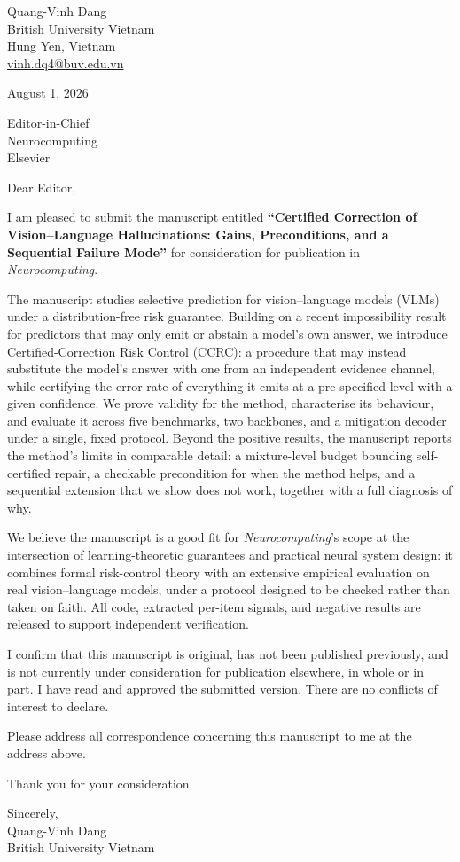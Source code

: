 \documentclass[11pt]{article}
\begin{document}
\begin{flushleft}
Quang-Vinh Dang \\
British University Vietnam \\
Hung Yen, Vietnam \\
\href{mailto:vinh.dq4@buv.edu.vn}{vinh.dq4@buv.edu.vn}
\end{flushleft}

\begin{flushright}
August 1, 2026
\end{flushright}

\noindent Editor-in-Chief \\
Neurocomputing \\
Elsevier

\bigskip
\noindent Dear Editor,

\medskip
\noindent I am pleased to submit the manuscript entitled \textbf{``Certified Correction of
Vision--Language Hallucinations: Gains, Preconditions, and a Sequential Failure Mode''} for
consideration for publication in \emph{Neurocomputing}.

\medskip
\noindent The manuscript studies selective prediction for vision--language models (VLMs) under
a distribution-free risk guarantee. Building on a recent impossibility result for predictors
that may only emit or abstain a model's own answer, we introduce Certified-Correction Risk
Control (CCRC): a procedure that may instead substitute the model's answer with one from an
independent evidence channel, while certifying the error rate of everything it emits at a
pre-specified level with a given confidence. We prove validity for the method, characterise its
behaviour, and evaluate it across five benchmarks, two backbones, and a mitigation decoder under
a single, fixed protocol. Beyond the positive results, the manuscript reports the method's
limits in comparable detail: a mixture-level budget bounding self-certified repair, a checkable
precondition for when the method helps, and a sequential extension that we show does not work,
together with a full diagnosis of why.

\medskip
\noindent We believe the manuscript is a good fit for \emph{Neurocomputing}'s scope at the
intersection of learning-theoretic guarantees and practical neural system design: it combines
formal risk-control theory with an extensive empirical evaluation on real vision--language
models, under a protocol designed to be checked rather than taken on faith. All code, extracted
per-item signals, and negative results are released to support independent verification.

\medskip
\noindent I confirm that this manuscript is original, has not been published previously, and is
not currently under consideration for publication elsewhere, in whole or in part. I have read
and approved the submitted version. There are no conflicts of interest to declare.

\medskip
\noindent Please address all correspondence concerning this manuscript to me at the address
above.

\medskip
\noindent Thank you for your consideration.

\bigskip
\noindent Sincerely, \\[2\baselineskip]
Quang-Vinh Dang \\
British University Vietnam
\end{document}

